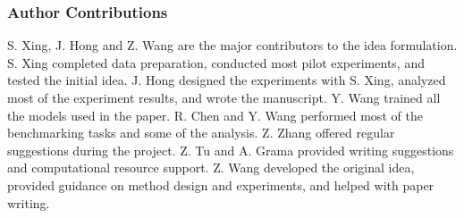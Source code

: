 
\subsubsection*{Author Contributions}
S. Xing, J. Hong and Z. Wang are the major contributors to the idea formulation.
S. Xing completed data preparation, conducted most pilot experiments, and tested the initial idea.
J. Hong designed the experiments with S. Xing, analyzed most of the experiment results, and wrote the manuscript.  
Y. Wang trained all the models used in the paper.  
R. Chen and Y. Wang performed most of the benchmarking tasks and some of the analysis.  
Z. Zhang offered regular suggestions during the project.
Z. Tu and A. Grama provided writing suggestions and computational resource support.
Z. Wang developed the original idea, provided guidance on method design and experiments, and helped with paper writing.  

